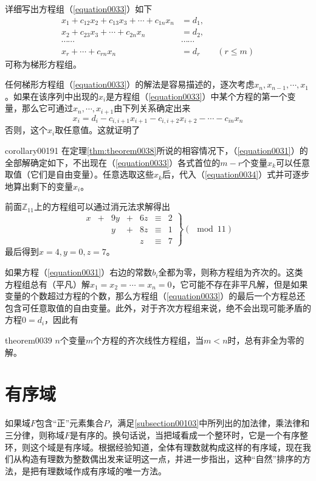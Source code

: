 详细写出方程组（\ref{equation0033}）如下
\begin{equation}\label{equation0034}
\begin{aligned}
x_1+c_{12}x_2+c_{13}x_3+\cdots+c_{1n}x_n&=d_1,\\
x_2+c_{23}x_3+\cdots+c_{2n}x_n&=d_2,\\
\cdots\cdots&\cdots\cdots\\
x_r+\cdots+c_{rn}x_n&=d_r\qquad(r \le m)
\end{aligned}
\end{equation}
可称为梯形方程组。

任何梯形方程组（\ref{equation0033}）的解法是容易描述的，逐次考虑$x_{n}, x_{n-1}, \cdots, x_1$。如果在该序列中出现的$x_i$是方程组（\ref{equation0033}）中某个方程的第一个变量，那么它可通过$x_n,\cdots, x_{i+1}$由下列关系确定出来
\[
x_i = d_i - c_{i,i+1}x_{i+1}-c_{i,i+2}x_{i+2}-\cdots-c_{in}x_n
\]
否则，这个$x_i$取任意值。这就证明了
\begin{corollary}{}{corollary00191}
在定理\ref{thm:theorem0038}所说的相容情况下，（\ref{equation0031}）的全部解确定如下，不出现在（\ref{equation0033}）各式首位的$m-r$个变量$x_k$可以任意取值（它们是自由变量）。任意选取这些$x_k$后，代入（\ref{equation0034}）式并可逐步地算出剩下的变量$x_i$。
\end{corollary}

前面$\mathbb{Z}_11$上的方程组可以通过消元法求解得出
\[
\left.
\begin{array}{rcrcrcl}
x&+&9y&+&6z&\equiv&2\\
&&y&+&8z&\equiv&1\\
&&&&z&\equiv&7
\end{array}
\right\}(\mod{11})
\]
最后得到$x=4,y=0,z=7$。


如果方程（\ref{equation0031}）右边的常数$b_i$全都为零，则称方程组为齐次的。这类方程组总有（平凡）解$x_1=x_2=\cdots=x_n=0$，它可能不存在非平凡解，但是如果变量的个数超过方程的个数，那么方程组（\ref{equation0033}）的最后一个方程总还包含可任意取值的自由变量。此外，对于齐次方程组来说，绝不会出现可能矛盾的方程$0=d_i$，因此有
\begin{theorem}{}{theorem0039}
$n$个变量$m$个方程的齐次线性方程组，当$m < n$时，总有非全为零的解。
\end{theorem}

\section{有序域}
如果域$F$包含“正”元素集合$P$，满足\ref{subsection00103}中所列出的加法律，乘法律和三分律，则称域$F$是有序的。换句话说，当把域看成一个整环时，它是一个有序整环，则这个域是有序域。根据经验知道，全体有理数就构成这样的有序域，现在我们从构造有理数为整数偶出发来证明这一点，并进一步指出，这种“自然”排序的方法，是把有理数域作成有序域的唯一方法。

